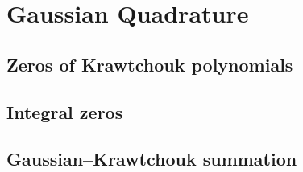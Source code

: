 \chapter{Gaussian Quadrature}
\label{ch:17}
\section{Zeros of Krawtchouk polynomials}
\label{sec:17-1}

\section{Integral zeros}
\label{sec:17-2}

\section{Gaussian--Krawtchouk summation}
\label{sec:17-3}

